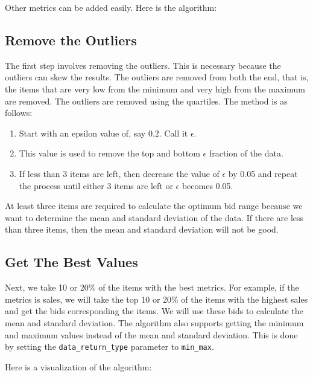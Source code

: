 Other metrics can be added easily. Here is the algorithm:

\subsection{Remove the Outliers}

The first step involves removing the outliers. This is necessary because the outliers can skew the results. The outliers are removed from both the end, that is, the items that are very low from the minimum and very high from the maximum are removed. The outliers are removed using the quartiles. The method is as follows:

\begin{enumerate}
    \item Start with an epsilon value of, say 0.2. Call it \(\epsilon\).
    \item This value is used to remove the top and bottom \(\epsilon\) fraction of the data.
    \item If less than 3 items are left, then decrease the value of \(\epsilon\) by 0.05 and repeat the process until either 3 items are left or \(\epsilon\) becomes 0.05.
\end{enumerate}

\begin{outline}
    At least three items are required to calculate the optimum bid range because we want to determine the mean and standard deviation of the data. If there are less than three items, then the mean and standard deviation will not be good.
\end{outline}


\subsection{Get The Best Values}

Next, we take 10 or 20\% of the items with the best metrics. For example, if the metrics is sales, we will take the top 10 or 20\% of the items with the highest sales and get the bids corresponding the items. We will use these bids to calculate the mean and standard deviation. The algorithm also supports getting the minimum and maximum values instead of the mean and standard deviation. This is done by setting the \texttt{data\_return\_type} parameter to \texttt{min\_max}.

Here is a visualization of the algorithm:

